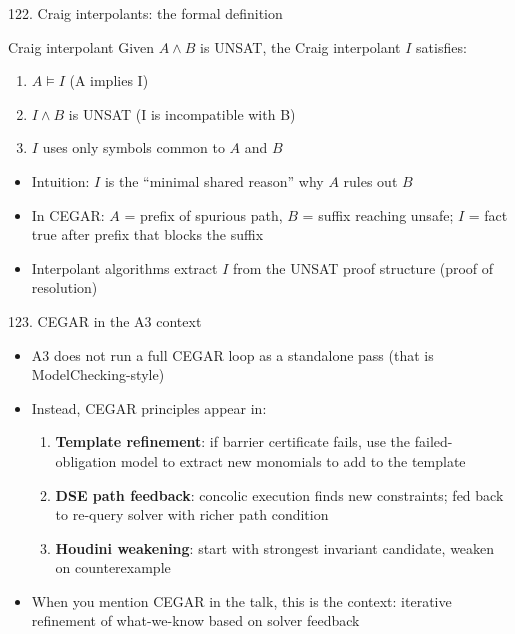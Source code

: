 \documentclass[aspectratio=169]{beamer}
\begin{document}
\begin{frame}{122. Craig interpolants: the formal definition}
\begin{block}{Craig interpolant}
Given \(A \wedge B\) is UNSAT, the Craig interpolant \(I\) satisfies:
\begin{enumerate}
  \item \(A \models I\) \quad (A implies I)
  \item \(I \wedge B\) is UNSAT \quad (I is incompatible with B)
  \item \(I\) uses only symbols common to \(A\) and \(B\)
\end{enumerate}
\end{block}
\begin{itemize}
  \item Intuition: \(I\) is the ``minimal shared reason'' why \(A\) rules out \(B\)
  \item In CEGAR: \(A\) = prefix of spurious path, \(B\) = suffix reaching unsafe; \(I\) = fact true after prefix that blocks the suffix
  \item Interpolant algorithms extract \(I\) from the UNSAT proof structure (proof of resolution)
\end{itemize}
\end{frame}

\begin{frame}{123. CEGAR in the A3 context}
\begin{itemize}
  \item A3 does not run a full CEGAR loop as a standalone pass (that is ModelChecking-style)
  \item Instead, CEGAR principles appear in:
    \begin{enumerate}
      \item \textbf{Template refinement}: if barrier certificate fails, use the failed-obligation model to extract new monomials to add to the template
      \item \textbf{DSE path feedback}: concolic execution finds new constraints; fed back to re-query solver with richer path condition
      \item \textbf{Houdini weakening}: start with strongest invariant candidate, weaken on counterexample
    \end{enumerate}
  \item When you mention CEGAR in the talk, this is the context: iterative refinement of what-we-know based on solver feedback
\end{itemize}
\end{frame}
\end{document}
